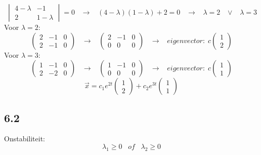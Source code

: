 \documentclass[11pt]{article}
\begin{document}
\[
\begin{vmatrix}
4-\lambda & -1 \\
2 & 1-\lambda
\end{vmatrix}
=0
\;\;\;\longrightarrow\;\;\;
(4-\lambda)(1-\lambda)+2=0
\;\;\;\longrightarrow\;\;\;
\lambda = 2 \;\;\;\vee\;\;\;\lambda = 3
\]
Voor $\lambda = 2$: 
\[
\left(
\begin{array}{cc|c}
2 & -1 & 0 \\
2 & -1 & 0
\end{array}
\right)
\;\;\;\longrightarrow\;\;\;
\left(
\begin{array}{cc|c}
2 & -1 & 0 \\
0 & 0 & 0
\end{array}
\right)
\;\;\;\longrightarrow\;\;\;
eigenvector:\;
c
\begin{pmatrix}
1\\2
\end{pmatrix}
\]
Voor $\lambda = 3$: 
\[
\left(
\begin{array}{cc|c}
1 & -1 & 0 \\
2 & -2 & 0
\end{array}
\right)
\;\;\;\longrightarrow\;\;\;
\left(
\begin{array}{cc|c}
1 & -1 & 0 \\
0 & 0 & 0
\end{array}
\right)
\;\;\;\longrightarrow\;\;\;
eigenvector:\;
c
\begin{pmatrix}
1\\1
\end{pmatrix}
\]
\[
\vec{x} = c_1e^{2t}\begin{pmatrix}
1\\2
\end{pmatrix}+c_2e^{3t}\begin{pmatrix}
1\\1
\end{pmatrix}
\]

\subsection*{6.2}
Onstabiliteit:
\[
\lambda_1 \ge 0 \;\;\;of\;\;\; \lambda_2 \ge 0
\]
\end{document}
